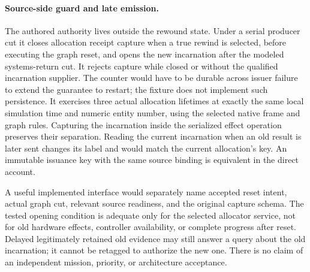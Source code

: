 \documentclass{article}
\begin{document}
\paragraph{Source-side guard and late emission.}
The authored authority lives outside the rewound state. Under a serial
producer cut it closes allocation receipt capture when a true rewind
is selected, before executing the graph reset, and opens the new
incarnation after the modeled systems-return cut. It rejects capture
while closed or without the qualified incarnation supplier. The
counter would have to be durable across issuer failure to extend the
guarantee to restart; the fixture does not implement such persistence.
It exercises three actual allocation lifetimes at exactly the same local
simulation time and numeric entity number, using the selected native
frame and graph rules. Capturing the incarnation inside the serialized
effect operation preserves their separation. Reading the current
incarnation when an old result is later sent changes its label and
would match the current allocation's key. An immutable issuance key
with the same source binding is equivalent in the direct account.

A useful implemented interface would separately name accepted reset
intent, actual graph cut, relevant source readiness, and the original
capture schema. The tested opening condition is adequate only for the
selected allocator service, not for old hardware effects, controller
availability, or complete progress after reset. Delayed legitimately
retained old evidence may still answer a query about the old
incarnation; it cannot be retagged to authorize the new one. There is
no claim of an independent mission, priority, or architecture
acceptance.
\end{document}

